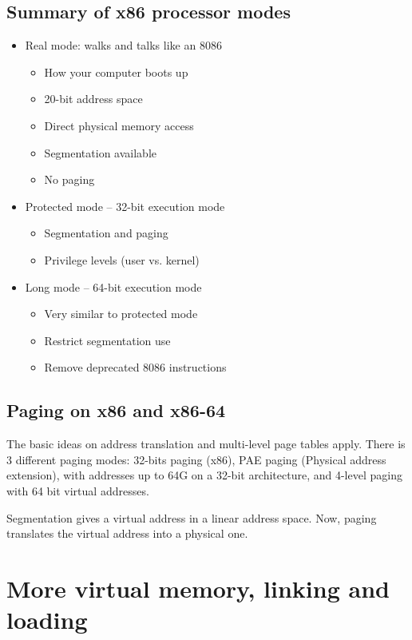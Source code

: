 \documentclass[toc]{../cs-classes/cs-classes}
\begin{document}
\subsection{Summary of x86 processor modes}
\begin{itemize}
    \item Real mode: walks and talks like an 8086
    \begin{itemize}
        \item How your computer boots up
        \item 20-bit address space
        \item Direct physical memory access
        \item Segmentation available
        \item No paging
    \end{itemize}
    \item Protected mode -- 32-bit execution mode
    \begin{itemize}
        \item Segmentation and paging
        \item Privilege levels (user vs. kernel)
    \end{itemize}
    \item Long mode -- 64-bit execution mode
    \begin{itemize}
        \item Very similar to protected mode
        \item Restrict segmentation use
        \item Remove deprecated 8086 instructions
    \end{itemize}
\end{itemize}

\subsection{Paging on x86 and x86-64}
The basic ideas on address translation and multi-level page tables apply. There is 3 different paging modes: 32-bits paging (x86), PAE paging (Physical address extension), with addresses up to 64G on a 32-bit architecture, and 4-level paging with 64 bit virtual addresses.

Segmentation gives a virtual address in a linear address space. Now, paging translates the virtual address into a physical one.

\section{More virtual memory, linking and loading}
\end{document}
